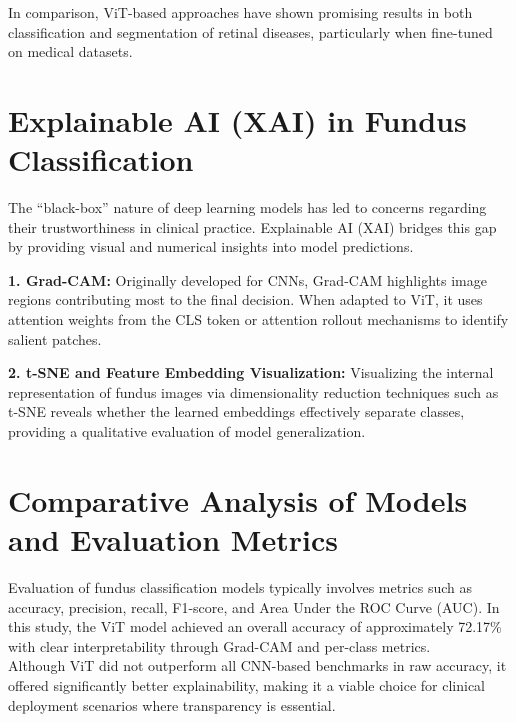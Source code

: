 \documentclass[a4paper,12pt]{report}
\begin{document}
In comparison, ViT-based approaches have shown promising results in both classification and segmentation of retinal diseases, particularly when fine-tuned on medical datasets.

\section*{Explainable AI (XAI) in Fundus Classification}

The “black-box” nature of deep learning models has led to concerns regarding their trustworthiness in clinical practice. Explainable AI (XAI) bridges this gap by providing visual and numerical insights into model predictions.

\textbf{1. Grad-CAM:}  
Originally developed for CNNs, Grad-CAM highlights image regions contributing most to the final decision. When adapted to ViT, it uses attention weights from the CLS token or attention rollout mechanisms to identify salient patches.


\textbf{2. t-SNE and Feature Embedding Visualization:}  
Visualizing the internal representation of fundus images via dimensionality reduction techniques such as t-SNE  reveals whether the learned embeddings effectively separate classes, providing a qualitative evaluation of model generalization.

\section*{Comparative Analysis of Models and Evaluation Metrics}

Evaluation of fundus classification models typically involves metrics such as accuracy, precision, recall, F1-score, and Area Under the ROC Curve (AUC). In this study, the ViT model achieved an overall accuracy of approximately 72.17\% with clear interpretability through Grad-CAM and per-class metrics.\\

Although ViT did not outperform all CNN-based benchmarks in raw accuracy, it offered significantly better explainability, making it a viable choice for clinical deployment scenarios where transparency is essential.
\end{document}
